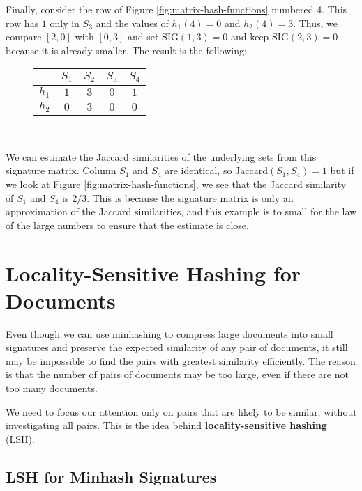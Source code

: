 Finally, consider the row of Figure \ref{fig:matrix-hash-functions} numbered 4. This row has $1$ only in $S_3$ and the values of $h_1(4) = 0$ and $h_2(4) = 3$. Thus, we compare $[2, 0]$ with $[0, 3]$ and set $\text{SIG}(1, 3) = 0$ and keep $\text{SIG}(2, 3) = 0$ because it is already smaller. The result is the following:

\begin{figure}[H]
\centering
\begin{tabular}{|c||c|c|c|c|}
  \hline
   & $S_1$ & $S_2$ & $S_3$ & $S_4$\\
  \hline
  $h_1$ & $1$ & $3$ & $0$ & $1$ \\ 
  $h_2$ & $0$ & $3$ & $0$ & $0$ \\
  \hline
\end{tabular}
\captionsetup{justification=centering}\\
\label{fig:sig-matrix-3}
\end{figure}

We can estimate the Jaccard similarities of the underlying sets from this signature matrix. Column $S_1$ and $S_4$ are identical, so $\text{Jaccard}(S_1, S_4) = 1$ but if we look at Figure \ref{fig:matrix-hash-functions}, we see that the Jaccard similarity of $S_1$ and $S_4$ is $2/3$. This is because the signature matrix is only an approximation of the Jaccard similarities, and this example is to small for the law of the large numbers to ensure that the estimate is close.

\section{Locality-Sensitive Hashing for Documents}\label{sec:lsh-documents}

Even though we can use minhashing to compress large documents into small signatures and preserve the expected similarity of any pair of documents, it still may be impossible to find the pairs with greatest similarity efficiently. The reason is that the number of pairs of documents may be too large, even if there are not too many documents. 

We need to focus our attention only on pairs that are likely to be similar, without investigating all pairs. This is the idea behind \textbf{locality-sensitive hashing} (LSH).

\subsection{LSH for Minhash Signatures}\label{sec:lsh-minhash}

